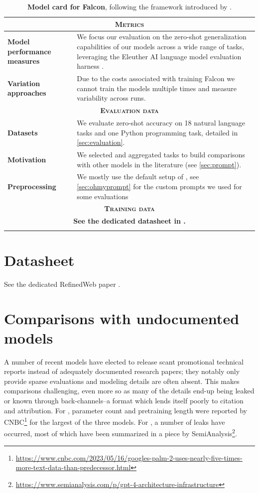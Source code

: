 \documentclass{article}
\begin{document}
\begin{longtable}{p{4cm}|p{9cm}}
    \multicolumn{2}{c}{\textsc{\textbf{Metrics}}} \\ \midrule
    \textbf{Model performance measures} & We focus our evaluation on the zero-shot generalization capabilities of our models across a wide range of tasks, leveraging the Eleuther AI language model evaluation harness \cite{eval-harness}.  \\ \midrule
    \textbf{Variation approaches} & Due to the costs associated with training Falcon we cannot train the models multiple times and measure variability across runs. \\ \midrule
    \multicolumn{2}{c}{\textsc{\textbf{Evaluation data}}} \\ \midrule
    \textbf{Datasets} & We evaluate zero-shot accuracy on 18 natural language tasks and one Python programming task, detailed in \cref{sec:evaluation}. \\ \midrule
    \textbf{Motivation} & We selected and aggregated tasks to build comparisons with other models in the literature (see \cref{sec:prompt}). \\ \midrule
    \textbf{Preprocessing} & We mostly use the default setup of \cite{eval-harness}, see \cref{sec:ohmyprompt} for the custom prompts we used for some evaluations \\ \midrule
    \multicolumn{2}{c}{\textsc{\textbf{Training data}}} \\ \midrule
    \multicolumn{2}{c}{\textbf{See the dedicated datasheet in \citet{refinedweb}.}} \\
    \bottomrule
    \caption{\textbf{Model card for Falcon}, following the framework introduced by \cite{mitchell2019model}.}
    \label{tab:model_card}
\end{longtable}

\section{Datasheet}

See the dedicated RefinedWeb paper \citep{refinedweb}.

\section{Comparisons with undocumented models}
\label{sec:unofficial}

A number of recent models have elected to release scant promotional technical reports instead of adequately documented research papers; they notably only provide sparse evaluations and modeling details are often absent. This makes comparisons challenging, even more so as many of the details end-up being leaked or known through back-channels--a format which lends itself poorly to citation and attribution. For \citet{palm-2}, parameter count and pretraining length were reported by CNBC\footnote{\url{https://www.cnbc.com/2023/05/16/googles-palm-2-uses-nearly-five-times-more-text-data-than-predecessor.html}} for the largest of the three models. For \citet{gpt-4}, a number of leaks have occurred, most of which have been summarized in a piece by SemiAnalysis\footnote{\url{https://www.semianalysis.com/p/gpt-4-architecture-infrastructure}}.  
\end{document}
